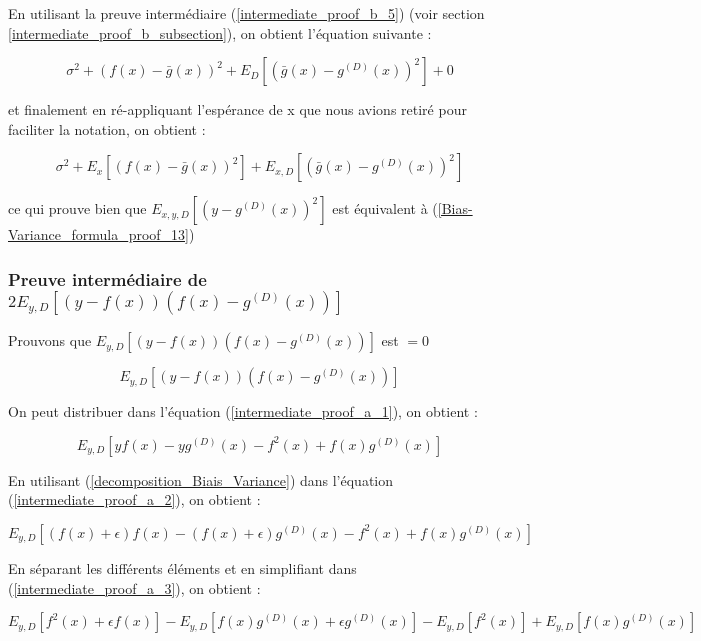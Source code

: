 \documentclass[a4paper]{article}
\begin{document}
En utilisant la preuve intermédiaire (\ref{intermediate_proof_b_5}) (voir section \ref{intermediate_proof_b_subsection}), on obtient l'équation suivante :

\begin{equation}
	\label{Bias-Variance_formula_proof_12}
		\sigma^2 + (f(x) -\bar{g}(x))^2 + E_{D} [(\bar{g}(x) - g^{(D)}(x))^2] + 0
\end{equation}

et finalement en ré-appliquant l'espérance de x que nous avions retiré pour faciliter la notation, on obtient :

\begin{equation}
	\label{Bias-Variance_formula_proof_13}
	\sigma^2 + E_x[(f(x) -\bar{g}(x))^2] + E_{x,D} [(\bar{g}(x) - g^{(D)}(x))^2]
\end{equation}

ce qui prouve bien que $ E_{x,y,D}[(y-g^{(D)}(x))^2] $ est équivalent à (\ref{Bias-Variance_formula_proof_13})
\newpage

\subsubsection{Preuve intermédiaire de $2E_{y,D} [(y-f(x)) (f(x) - g^{(D)}(x)) ]$}
\label{intermediate_proof_a_subsection}
Prouvons que $E_{y,D} [(y-f(x)) (f(x) - g^{(D)}(x)) ]$ est $= 0$ 

\begin{equation}
\label{intermediate_proof_a_1}
	E_{y,D} [(y-f(x)) (f(x) - g^{(D)}(x)) ]
\end{equation}

On peut distribuer dans l'équation (\ref{intermediate_proof_a_1}), on obtient :

\begin{equation}
\label{intermediate_proof_a_2}
	E_{y,D} [yf(x) -yg^{(D)}(x) - f^2(x) + f(x)g^{(D)}(x)]
\end{equation}

En utilisant (\ref{decomposition_Biais_Variance}) dans l'équation (\ref{intermediate_proof_a_2}), on obtient :

\begin{equation}
\label{intermediate_proof_a_3}
E_{y,D} [(f(x) + \epsilon)f(x) -(f(x) + \epsilon)g^{(D)}(x) - f^2(x) + f(x)g^{(D)}(x)]
\end{equation}

En séparant les différents éléments et en simplifiant dans (\ref{intermediate_proof_a_3}), on obtient :

\begin{equation}
\label{intermediate_proof_a_4}
E_{y,D} [f^2(x) + \epsilon f(x)] - E_{y,D}[f(x)g^{(D)}(x) + \epsilon g^{(D)}(x)] - E_{y,D}[f^2(x)] + E_{y,D}[f(x)g^{(D)}(x)]
\end{equation}
\end{document}
